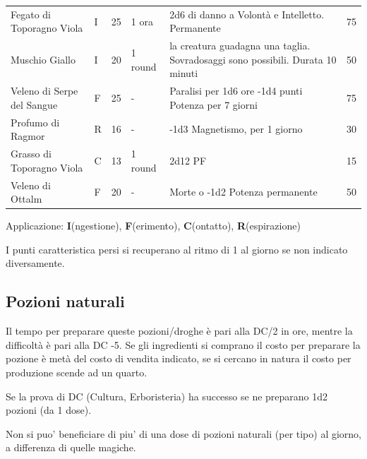 \documentclass[a4paper,11pt,twoside,openany]{book}
\begin{document}
\begin{tabularx}{0.95\textwidth}{XlllXl}
	Fegato di Toporagno Viola \index{Fegato di Toporagno Viola}   & I  & 25    & 1 ora    & 2d6 di danno a Volontà e Intelletto. Permanente   & 75   \\
	Muschio Giallo \index{Muschio Giallo}& I  & 20    & 1 round  & la creatura guadagna una taglia. Sovradosaggi sono possibili. Durata 10 minuti  & 50\\
	Veleno di Serpe del Sangue \index{Veleno di Serpe del Sangue} & F  & 25    & -   & Paralisi per 1d6 ore -1d4 punti Potenza per 7 giorni   & 75   \\
	Profumo di Ragmor \index{Profumo di Ragmor}    & R  & 16    & -   & -1d3 Magnetismo, per 1 giorno & 30\\
	Grasso di Toporagno Viola \index{Grasso di Toporagno Viola}   & C  & 13    & 1 round  & 2d12 PF & 15\\
	Veleno di Ottalm\index{Veleno di Ottalm}  & F  & 20    & -   & Morte o -1d2 Potenza permanente  & 50\\
\end{tabularx}

Applicazione: \textbf{I}(ngestione), \textbf{F}(erimento),  \textbf{C}(ontatto), \textbf{R}(espirazione)
\bigskip

I punti caratteristica persi si recuperano al ritmo di 1 al giorno se non indicato diversamente.

\subsection{Pozioni naturali}

Il tempo per preparare queste pozioni/droghe è pari alla DC/2 in ore, mentre la difficoltà è pari alla DC -5. Se gli ingredienti si comprano il costo per preparare la pozione è metà del costo di vendita indicato, se si cercano in natura il costo per produzione scende ad un quarto.

Se la prova di DC (Cultura, Erboristeria) ha successo se ne preparano 1d2 pozioni (da 1 dose).

Non si puo' beneficiare di piu' di una dose di pozioni naturali (per tipo) al giorno, a differenza di quelle magiche.

\bigskip
\end{document}
